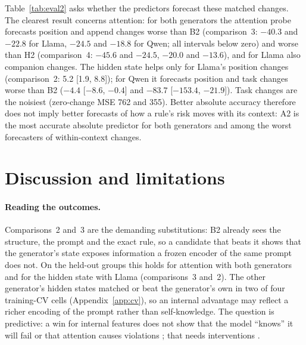 \documentclass{article}
\begin{document}
Table~\ref{tab:eval2} asks whether the predictors forecast these matched changes. The clearest result concerns
attention: for both generators the attention probe forecasts position and append changes worse than B2 (comparison~3:
$-40.3$ and $-22.8$ for Llama, $-24.5$ and $-18.8$ for Qwen; all intervals below zero) and worse than H2 (comparison~4:
$-45.6$ and $-24.5$, $-20.0$ and $-13.6$), and for Llama also companion changes. The hidden state helps only for Llama's
position changes (comparison~2: 5.2 [1.9, 8.8]); for Qwen it forecasts position and task changes worse than B2 ($-4.4$
[$-8.6$, $-0.4$] and $-83.7$ [$-153.4$, $-21.9$]). Task changes are the noisiest (zero-change MSE 762 and 355).
Better absolute accuracy therefore does not imply better forecasts of how a rule's risk moves with its context: A2 is
the most accurate absolute predictor for both generators and among the worst forecasters of within-context changes.

\section{Discussion and limitations}
\label{sec:discussion}

\paragraph{Reading the outcomes.} Comparisons~2 and~3 are the demanding substitutions: B2 already sees the structure,
the prompt and the exact rule, so a candidate that beats it shows that the generator's state exposes information a
frozen encoder of the same prompt does not. On the held-out groups this holds for attention with both generators and for the hidden state with Llama
(comparisons~3 and~2). The other generator's hidden states matched or beat the generator's own in two of four training-CV cells
(Appendix~\ref{app:cv}), so an internal advantage may reflect a richer encoding of the prompt rather than self-knowledge.
The question is predictive: a win for internal features does not show
that the model ``knows'' it will fail or that attention causes violations \citep{jain2019attention,wiegreffe2019attention};
that needs interventions \citep{li2023iti,stolfo2025steering,zhang2024pasta}.
\end{document}
